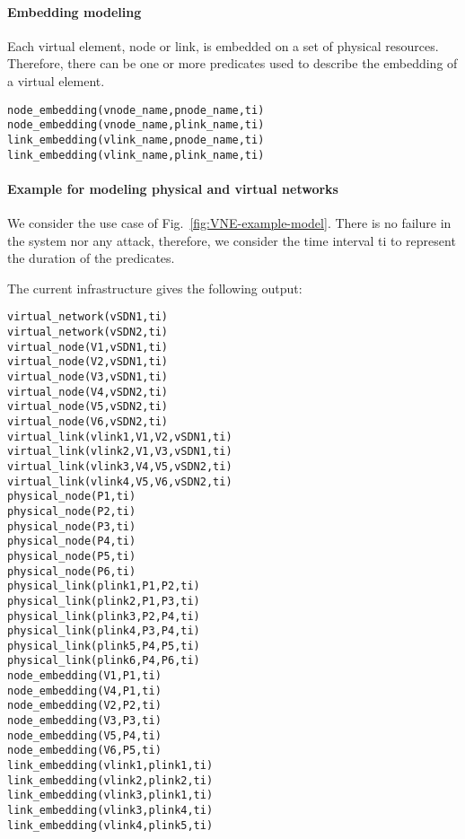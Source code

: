 \paragraph{Embedding modeling}
Each virtual element, node or link, is embedded on a set of physical resources.
Therefore, there can be one or more predicates used to describe the embedding of a virtual element.

\begin{lstlisting}[backgroundcolor = \color{lightgray}]
node_embedding(vnode_name,pnode_name,ti)
node_embedding(vnode_name,plink_name,ti)
link_embedding(vlink_name,pnode_name,ti)
link_embedding(vlink_name,plink_name,ti)
\end{lstlisting}

\paragraph{Example for modeling physical and virtual networks}

We consider the use case of Fig.~\ref{fig:VNE-example-model}.
There is no failure in the system nor any attack, therefore, we consider the time interval ti to represent the duration of the predicates.



The current infrastructure gives the following output:

\begin{lstlisting}[backgroundcolor = \color{lightgray}]
virtual_network(vSDN1,ti)
virtual_network(vSDN2,ti)
virtual_node(V1,vSDN1,ti)
virtual_node(V2,vSDN1,ti)
virtual_node(V3,vSDN1,ti)
virtual_node(V4,vSDN2,ti)
virtual_node(V5,vSDN2,ti)
virtual_node(V6,vSDN2,ti)
virtual_link(vlink1,V1,V2,vSDN1,ti)
virtual_link(vlink2,V1,V3,vSDN1,ti)
virtual_link(vlink3,V4,V5,vSDN2,ti)
virtual_link(vlink4,V5,V6,vSDN2,ti)
physical_node(P1,ti)
physical_node(P2,ti)
physical_node(P3,ti)
physical_node(P4,ti)
physical_node(P5,ti)
physical_node(P6,ti)
physical_link(plink1,P1,P2,ti)
physical_link(plink2,P1,P3,ti)
physical_link(plink3,P2,P4,ti)
physical_link(plink4,P3,P4,ti)
physical_link(plink5,P4,P5,ti)
physical_link(plink6,P4,P6,ti)
node_embedding(V1,P1,ti)
node_embedding(V4,P1,ti)
node_embedding(V2,P2,ti)
node_embedding(V3,P3,ti)
node_embedding(V5,P4,ti)
node_embedding(V6,P5,ti)
link_embedding(vlink1,plink1,ti)
link_embedding(vlink2,plink2,ti)
link_embedding(vlink3,plink1,ti)
link_embedding(vlink3,plink4,ti)
link_embedding(vlink4,plink5,ti)
\end{lstlisting}